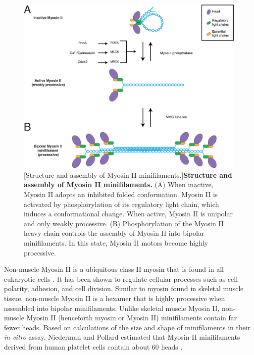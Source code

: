 \documentclass{ucetd}
\begin{document}
\begin{figure}[!htbp]
\centering
\includegraphics[width=1\textwidth]{Figure1-1}
[Structure and assembly of Myosin II minifilaments.]{\textbf{Structure and assembly of Myosin II minifilaments.} (A) When inactive, Myosin II adopts an inhibited folded conformation.  Myosin II is activated by phosphorylation of its regulatory light chain, which induces a conformational change. When active, Myosin II is unipolar and only weakly processive. (B) Phosphorylation of the Myosin II heavy chain controls the assembly of Myosin II into bipolar minifilaments.  In this state, Myosin II motors become highly processive.}
\end{figure}

 Non-muscle Myosin II is a ubiquitous class II myosin that is found in all eukaryotic cells \cite{Conti:2007hc, VicenteManzanares:2009ik}.  It has been shown to regulate cellular processes such as cell polarity, adhesion, and cell division.  Similar to myosin found in skeletal muscle tissue, non-muscle Myosin II is a hexamer that is highly processive when assembled into bipolar minifilaments.  Unlike skeletal muscle Myosin II, non-muscle Myosin II (henceforth myosin or Myosin II) minifilaments contain far fewer heads.  Based on calculations of the size and shape of minifilaments in their \textit{in vitro} assay, Niederman and Pollard estimated that Myosin II minifilaments derived from human platelet cells contain about 60 heads \cite{Niederman:1975uu}.
\end{document}
